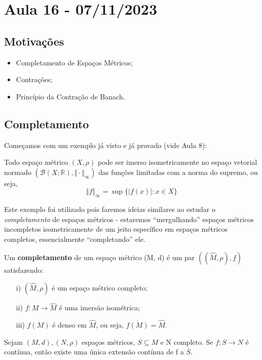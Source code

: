 \documentclass[metric_notes.tex]{subfiles}
\begin{document}
\section{Aula 16 - 07/11/2023}
\subsection{Motivações}
\begin{itemize}
	\item Completamento de Espaços Métricos;
	\item Contrações;
	\item Princípio da Contração de Banach.
\end{itemize}
\subsection{Completamento}
Começamos com um exemplo já visto e já provado (vide Aula 8):
\begin{example}
	Todo espaço métrico \((X, \rho )\) pode ser imerso isometricamente no espaço vetorial normado \((\mathcal{B}(X;\mathbb{R}), \Vert \cdot \Vert_{\infty})\) das funções
	limitadas com a norma do supremo, ou seja,
	\[
		\Vert f \Vert_{\infty} = \sup\{|f(x)|: x\in X\}
	\]
\end{example}
Este exemplo foi utilizado pois faremos ideias similares ao estudar o \textit{completamento} de espaços métricos - estaremos ``mergulhando'' espaços métricos incompletos
isometricamente de um jeito específico em espaços métricos completos, essencialmente ``completando'' ele.
\begin{def*}
	Um \textbf{completamento} de um espaço métrico (M, d) é um par \(((\hat{M}, \rho ), f)\) satisfazendo:
	\begin{itemize}
		\item[i)] \((\hat{M}, \rho )\) é um espaço métrico completo;
		\item[ii)] \(f:M\rightarrow \hat{M}\) é uma imersão isométrica;
		\item[iii)] \(f(M)\) é denso em \(\hat{M}\), ou seja, \(\overline{f(M)} = \hat{M}\).
	\end{itemize}
\end{def*}
\begin{lemma*}
	Sejam \((M, d), (N, \rho )\) espaços métricos, \(S\subseteq{M}\) e N completo. Se \(f:S\rightarrow N\) é contínua, então existe uma única extensão contínua de f a \(\overline{S}.\)
\end{lemma*}
\end{document}
